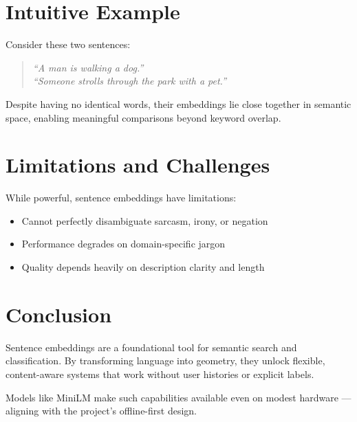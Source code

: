 \section{Intuitive Example}
Consider these two sentences:

\begin{quote}
\emph{``A man is walking a dog.''} \\
\emph{``Someone strolls through the park with a pet.''}
\end{quote}

Despite having no identical words, their embeddings lie close together in semantic space, enabling meaningful comparisons beyond keyword overlap.

\section{Limitations and Challenges}
While powerful, sentence embeddings have limitations:

\begin{itemize}
    \item Cannot perfectly disambiguate sarcasm, irony, or negation
    \item Performance degrades on domain-specific jargon
    \item Quality depends heavily on description clarity and length
\end{itemize}

\section{Conclusion}
Sentence embeddings are a foundational tool for semantic search and classification. By transforming language into geometry, they unlock flexible, content-aware systems that work without user histories or explicit labels.

Models like MiniLM make such capabilities available even on modest hardware — aligning with the project's offline-first design.

